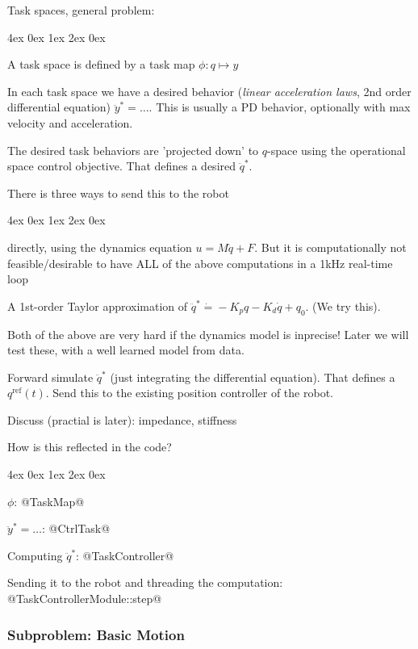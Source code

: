 \documentclass[10pt,fleqn,twoside]{article}
\newenvironment{items}[1][9]{
\par\setlength{\unitlength}{1pt}\fontsize{#1}{#1}\linespread{1.2}\selectfont
\begin{list}{--}{\leftmargin4ex \rightmargin0ex \labelsep1ex \labelwidth2ex
\topsep0pt \parsep0ex \itemsep3pt}
}{
\end{list}
}
\begin{document}
\begin{itemize}
\item Task spaces, general problem:
\begin{items}
\item A task space is defined by a task map $\phi: q \mapsto y$
\item In each task space we have a desired behavior (\emph{linear
  acceleration laws}, 2nd order
  differential equation) $\ddot y^* = \dots$. This is usually a PD behavior,
  optionally with max velocity and acceleration.
\item The desired task behaviors are 'projected down' to $q$-space
  using the operational space control objective. That defines a
  desired $\ddot q^*$.
\end{items}
\item There is three ways to send this to the robot
\begin{items}
\item directly, using the dynamics equation $u = M \ddot q + F$. But
  it is computationally not feasible/desirable to have ALL of the
  above computations in a 1kHz real-time loop
\item A 1st-order Taylor approximation of $\ddot q^* \dot= -K_p q -
  K_d \dot q + q_0$. (We try this).

Both of the above are very hard if the dynamics model is inprecise!
Later we will test these, with a well learned model from data.

\item Forward simulate $\ddot q^*$ (just integrating the differential
  equation). That defines a $q^\text{ref}(t)$. Send this to the
  existing position controller of the robot.
\end{items}
\item Discuss (practial is later): impedance, stiffness

\item How is this reflected in the code?
\begin{items}
\item $\phi$: @TaskMap@
\item $\ddot y^* = \dots$: @CtrlTask@
\item Computing $\ddot q^*$: @TaskController@
\item Sending it to the robot and threading the computation:
  @TaskControllerModule::step@
\end{items}
\end{itemize}


\subsubsection{Subproblem: Basic Motion}
\end{document}

